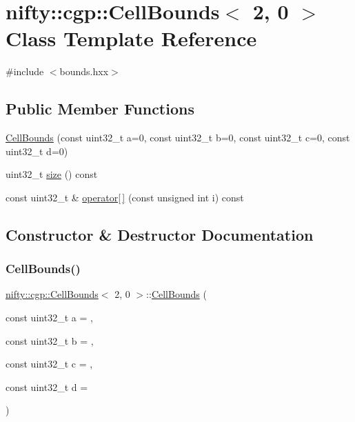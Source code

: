 \hypertarget{classnifty_1_1cgp_1_1CellBounds_3_012_00_010_01_4}{}\section{nifty\+:\+:cgp\+:\+:Cell\+Bounds$<$ 2, 0 $>$ Class Template Reference}
\label{classnifty_1_1cgp_1_1CellBounds_3_012_00_010_01_4}


{\ttfamily \#include $<$bounds.\+hxx$>$}

\subsection*{Public Member Functions}
\begin{DoxyCompactItemize}
\item 
\hyperlink{classnifty_1_1cgp_1_1CellBounds_3_012_00_010_01_4_a974e66625691a8938bc5731f85b7b107}{Cell\+Bounds} (const uint32\+\_\+t a=0, const uint32\+\_\+t b=0, const uint32\+\_\+t c=0, const uint32\+\_\+t d=0)
\item 
uint32\+\_\+t \hyperlink{classnifty_1_1cgp_1_1CellBounds_3_012_00_010_01_4_ad23fc19849f68bf4d71914f21bad9ce7}{size} () const
\item 
const uint32\+\_\+t \& \hyperlink{classnifty_1_1cgp_1_1CellBounds_3_012_00_010_01_4_abf65a8e2e5f5883485b27d9934d377a3}{operator\mbox{[}$\,$\mbox{]}} (const unsigned int i) const
\end{DoxyCompactItemize}


\subsection{Constructor \& Destructor Documentation}
\mbox{\label{classnifty_1_1cgp_1_1CellBounds_3_012_00_010_01_4_a974e66625691a8938bc5731f85b7b107}} 
\subsubsection{\texorpdfstring{Cell\+Bounds()}{CellBounds()}}
{\footnotesize\ttfamily \hyperlink{classnifty_1_1cgp_1_1CellBounds}{nifty\+::cgp\+::\+Cell\+Bounds}$<$ 2, 0 $>$\+::\hyperlink{classnifty_1_1cgp_1_1CellBounds}{Cell\+Bounds} (\begin{DoxyParamCaption}\item[{const uint32\+\_\+t}]{a = {},  }\item[{const uint32\+\_\+t}]{b = {},  }\item[{const uint32\+\_\+t}]{c = {},  }\item[{const uint32\+\_\+t}]{d = {} }\end{DoxyParamCaption})\hspace{0.3cm}{\ttfamily [inline]}}



